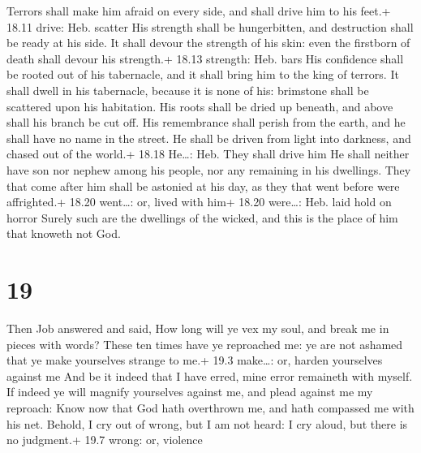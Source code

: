  Terrors shall make him afraid on every side, and shall
drive him to his feet.+ 18.11 drive: Heb. scatter  His
strength shall be hungerbitten, and destruction shall be ready at his
side.  It shall devour the strength of his skin: even the
firstborn of death shall devour his strength.+ 18.13 strength: Heb. bars
 His confidence shall be rooted out of his tabernacle, and
it shall bring him to the king of terrors.  It shall dwell
in his tabernacle, because it is none of his: brimstone shall be
scattered upon his habitation.  His roots shall be dried up
beneath, and above shall his branch be cut off.  His
remembrance shall perish from the earth, and he shall have no name in
the street.  He shall be driven from light into darkness,
and chased out of the world.+ 18.18 He\ldots: Heb. They shall drive him
 He shall neither have son nor nephew among his people, nor
any remaining in his dwellings.  They that come after him
shall be astonied at his day, as they that went before were affrighted.+
18.20 went\ldots: or, lived with him+ 18.20 were\ldots: Heb. laid hold
on horror  Surely such are the dwellings of the wicked, and
this is the place of him that knoweth not God.

\hypertarget{section-18}{%
\section{19}\label{section-18}}

 Then Job answered and said,  How long will ye
vex my soul, and break me in pieces with words?  These ten
times have ye reproached me: ye are not ashamed that ye make yourselves
strange to me.+ 19.3 make\ldots: or, harden yourselves against me
 And be it indeed that I have erred, mine error remaineth
with myself.  If indeed ye will magnify yourselves against
me, and plead against me my reproach:  Know now that God
hath overthrown me, and hath compassed me with his net. 
Behold, I cry out of wrong, but I am not heard: I cry aloud, but there
is no judgment.+ 19.7 wrong: or, violence

